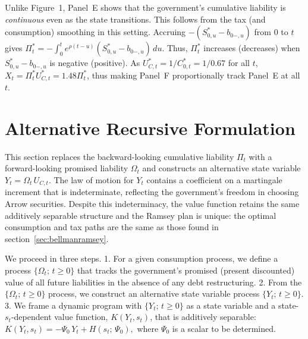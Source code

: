 \documentclass[12pt]{article}
\begin{document}



Unlike  Figure~1, Panel~E shows that the government's cumulative liability is {\it continuous} even as the state transitions. This  follows from the tax (and consumption) smoothing  in this setting. Accruing $-(S_{0,u}^*-b_{0-,u})$ from $0$ to $t$ gives $\Pi_t^* = - \int_0^t e^{\rho (t-u)}(S_{0,u}^*-b_{0-,u})\, du$. Thus, $\Pi_t^*$ increases (decreases) when  $S_{0,u}^*-b_{0-,u}$ is  negative  (positive). As $U_{C,t}^*=1/C_{0,t}^*=1/0.67$ for all $t$, $X_t= \Pi_t^* U_{C,t}^\ast= 1.48  \Pi_t^*$, thus making Panel~F  proportionally track Panel~E at all $t$. %







\section{Alternative  Recursive Formulation}\label{sec:indeterminacy} %

This section replaces the backward-looking cumulative liability $\Pi_t$ with a forward-looking promised liability $\Omega_t$ and constructs an alternative state variable $Y_t = \Omega_t\, U_{C,t}$. The law of motion for $Y_t$ contains a coefficient on a martingale increment that is indeterminate, reflecting the government's freedom in choosing Arrow securities.  Despite this indeterminacy, the value function retains the same additively separable structure and the Ramsey plan is unique: the optimal consumption and tax paths are the same as those found in section~\ref{sec:bellmanramsey}.

We proceed in three steps.
{ 
	1. For a given consumption process, we define  a process $\{\Omega_t;\, t \ge 0\}$ that tracks the government's promised (present discounted) value of all future liabilities in the absence of any debt restructuring. 2. From the  $\{\Omega_t;\, t \ge 0\}$ process, we  construct an alternative state variable process $\{Y_t;\, t \ge 0\}$. 3. We frame  a dynamic program with $\{Y_t;\, t \ge 0\}$ as a state variable and a state-$s_t$-dependent value function, $K(Y_t,s_t)$, that is additively separable: $K(Y_t,s_t) = -\Psi_0\, Y_t + H(s_t;\, \Psi_0),$ where  $\Psi_0$ is a scalar to be determined. 
} 
\end{document}
